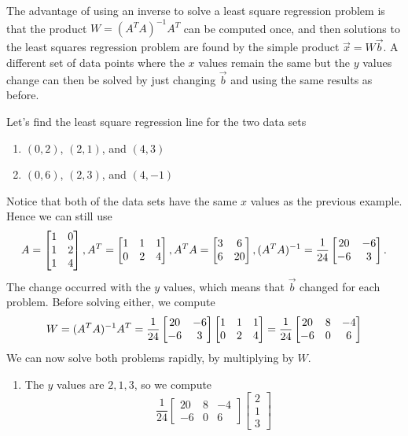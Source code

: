 The advantage of using an inverse to solve a least square regression problem is that the product $W=(A^TA)^{-1}A^T$ can be computed once, and then solutions to the least squares regression problem are found by the simple product $\vec x=W\vec b$. A different set of data points where the $x$ values remain the same but the $y$ values change can then be solved by just changing $\vec b$ and using the same results as before. 

\begin{example}
Let's find the least square regression line for the two data sets 
\begin{enumerate}
	\item $(0,2)$, $(2,1)$, and $(4,3)$
	\item $(0,6)$, $(2,3)$, and $(4,-1)$
\end{enumerate}
Notice that both of the data sets have the same $x$ values as the previous example.  Hence we can still use 
$$
A = \begin{bmatrix}1&0\\1&2\\1&4\end{bmatrix},
A^T= \begin{bmatrix}1&1&1\\0&2&4\end{bmatrix}, 
A^T A= \begin{bmatrix}3&6\\6&20\end{bmatrix}, 
(A^TA)^{-1}=\displaystyle\frac{1}{24}\begin{bmatrix}20&-6\\-6&3\end{bmatrix}.
$$ 
The change occurred with the $y$ values, which means that $\vec b$ changed for each problem.  Before solving either, we compute 
$$W=(A^TA)^{-1}A^T 
= \displaystyle\frac{1}{24}\begin{bmatrix}20&-6\\-6&3\end{bmatrix}\begin{bmatrix}1&1&1\\0&2&4\end{bmatrix}
= \displaystyle\frac{1}{24}\begin{bmatrix}20&8&-4\\-6&0&6\end{bmatrix}
$$
We can now solve both problems rapidly, by multiplying by $W$.
\begin{enumerate}
	\item The $y$ values are $2,1,3$, so we compute
$$\frac{1}{24}\begin{bmatrix}20&8&-4\\-6&0&6\end{bmatrix} \begin{bmatrix}2\\1\\3\end{bmatrix}
$$
\end{enumerate}
\end{example}
